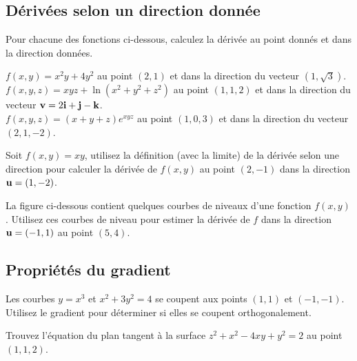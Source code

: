 \subsection{Dérivées selon un direction donnée}

\begin{question}[\eng]
Pour chacune des fonctions ci-dessous, calculez la dérivée au point
donnés et dans la direction données.

 $\displaystyle f(x,y)=x^2y+4y^2$ au point $(2,1)$ et dans la
direction du vecteur $(1,\sqrt{3})$. \\
 $\displaystyle f(x,y,z) = xyz + \ln(x^2+y^2+z^2)$ au point
$(1,1,2)$ et dans la direction du vecteur
$\displaystyle \mathbf{v} = 2\mathbf{i} + \mathbf{j} - \mathbf{k}$.\\
 $\displaystyle f(x,y,z) = (x+y+z) e^{xyz}$ au point $(1,0,3)$
et dans la direction du vecteur $(2,1,-2)$.
\label{15Q10}
\end{question}

\begin{question}[\eng]
Soit $f(x,y) = xy$, utilisez la définition (avec la
limite) de la dérivée selon une direction pour calculer la dérivée
de $f(x,y)$ au point $(2,-1)$ dans la direction $\mathbf{u} = (1,-2)$.
\label{15Q11}
\end{question}

\begin{question}[\eng]
La figure ci-dessous contient quelques courbes de niveaux d'une
fonction $f(x,y)$.  Utilisez ces courbes de niveau pour estimer la
dérivée de $f$ dans la direction $\mathbf{u} = (-1,1)$ au point $(5,4)$. 
\label{15Q12}
\end{question}

\subsection{Propriétés du gradient}

\begin{question}[\eng]
Les courbes $y =x^3$ et $x^2 + 3 y^2 = 4$ se coupent aux points $(1,1)$
et $(-1,-1)$.  Utilisez le gradient pour déterminer si elles se
coupent orthogonalement.
\label{15Q13}
\end{question}

\begin{question}[\eng]
Trouvez l'équation du plan tangent à la surface
$z^2 + x^2 - 4xy + y^2 = 2$ au point $(1,1,2)$.
\label{15Q14}
\end{question}

